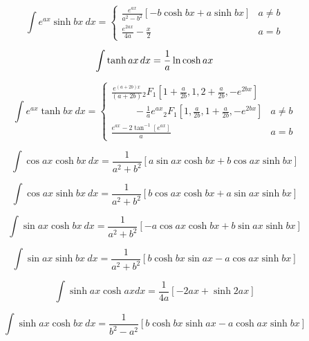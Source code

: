 \documentclass[12pt,letterpaper,leqno]{article}
\begin{document}
\begin{equation}
\int e^{ax} \sinh bx \ dx =
\begin{cases}
\displaystyle{\frac{e^{ax}}{a^2-b^2} }[ -b \cosh bx + a \sinh bx ]  & a\ne b \\
\displaystyle{\frac{e^{2ax}}{4a} - \frac{x}{2}}  & a = b
\end{cases}
\end{equation}


\begin{equation}\label{eq:yates}
\int  \tanh ax\hspace{1.5pt} dx =\frac{1}{a} \ln \cosh ax 
\end{equation}

\begin{equation}\label{eq:dewitt}
\int  e^{ax} \tanh bx\ dx = 
\begin{cases}
\displaystyle{ \frac{ e^{(a+2b)x}}{(a+2b)} 
{_2F_1}\left[ 1+\frac{a}{2b},1,2+\frac{a}{2b}, -e^{2bx}\right] }& \\
\displaystyle{
\hspace{1cm}-\frac{1}{a}e^{ax}{_2F_1}\left[ 1, \frac{a}{2b},1+\frac{a}{2b}, -e^{2bx}\right]
}
 & a\ne b \\
\displaystyle{\frac{e^{ax}-2\tan^{-1}[e^{ax}]}{a} } & a = b
\end{cases}
\end{equation}



\begin{equation}
\int \cos ax \cosh bx\ dx = 
\frac{1}{a^2 + b^2} \left[
a \sin ax \cosh bx  + b \cos ax \sinh bx
\right] 
\end{equation}

\begin{equation}
\int \cos ax \sinh bx\ dx = 
\frac{1}{a^2 + b^2} \left[
b \cos ax \cosh bx +
 a \sin ax \sinh bx
\right] 
\end{equation}

\begin{equation}
\int \sin ax \cosh bx \ dx = 
\frac{1}{a^2 + b^2} \left[
-a \cos ax \cosh bx +
 b \sin ax \sinh bx
\right] 
\end{equation}

\begin{equation}
\int \sin ax \sinh bx \ dx = 
\frac{1}{a^2 + b^2} \left[
b \cosh bx \sin ax -
 a \cos ax \sinh bx
\right] 
\end{equation}

\begin{equation}
\int \sinh ax \cosh ax dx= 
\frac{1}{4a}\left[ 
-2ax + \sinh 2ax \right]
\end{equation}

\begin{equation}
\int \sinh ax \cosh bx \ dx = 
\frac{1}{b^2-a^2}\left[ 
b \cosh bx \sinh ax 
- a \cosh ax \sinh bx \right]
\end{equation}
\end{document}
